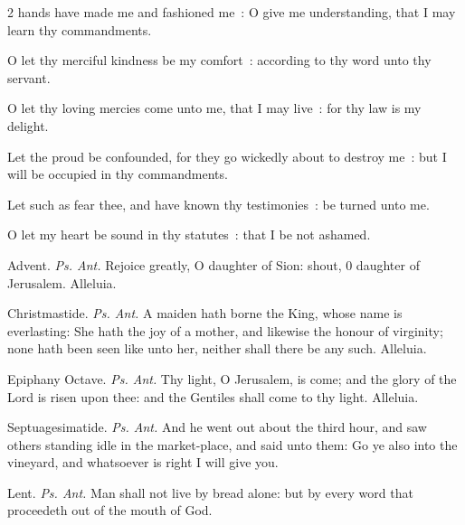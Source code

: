 \begin{multicols}{2}
 hands have made me and fashioned me~: O give me understanding, that I may learn thy commandments.\par
{}
O let thy merciful kindness be my comfort~: according to thy word unto thy servant.\par
{}O let thy loving mercies come unto me, that I may live~: for thy law is my delight.\par
{}Let the proud be confounded, for they go wickedly about to destroy me~: but I will be occupied in thy commandments.\par
{}Let such as fear thee, and have known thy testimonies~: be turned unto me.\par
{}O let my heart be sound in thy statutes~: that I be not ashamed.\\%
\par\noindent
{\color{RubricRed}Advent.} \textit{Ps. Ant.} Rejoice greatly, O daughter of Sion: shout, 0 daughter of Jerusalem. Alleluia.
\par\noindent
{\color{RubricRed}Christmastide.} \textit{Ps. Ant.} A maiden hath borne the King, whose name is everlasting: She hath the joy of a mother, and likewise the honour of virginity; none hath been seen like unto her, neither shall there be any such. Alleluia.
\par\noindent
{\color{RubricRed}Epiphany Octave.} \textit{Ps. Ant.} Thy light, O Jerusalem, is come; and the glory of the Lord is risen upon thee: and the Gentiles shall come to thy light. Alleluia.
\par\noindent
{\color{RubricRed}Septuagesimatide.} \textit{Ps. Ant.} And he went out about the third hour, and saw others standing idle in the market-place, and said unto them: Go ye also into the vineyard, and whatsoever is right I will give you.
\par\noindent
{\color{RubricRed}Lent.} \textit{Ps. Ant.} Man shall not live by bread alone: but by every word that proceedeth out of the mouth of God.

\end{multicols}
